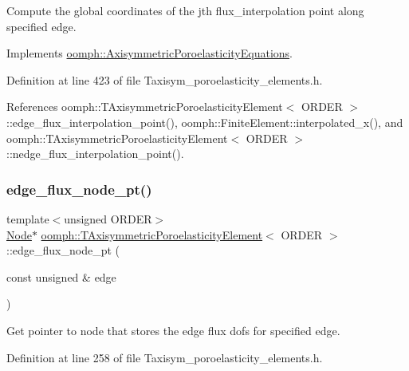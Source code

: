 Compute the global coordinates of the jth flux\+\_\+interpolation point along specified edge. 



Implements \hyperlink{classoomph_1_1AxisymmetricPoroelasticityEquations_a94eb24ad4a608057dd8601bbac14f241}{oomph\+::\+Axisymmetric\+Poroelasticity\+Equations}.



Definition at line 423 of file Taxisym\+\_\+poroelasticity\+\_\+elements.\+h.



References oomph\+::\+T\+Axisymmetric\+Poroelasticity\+Element$<$ O\+R\+D\+E\+R $>$\+::edge\+\_\+flux\+\_\+interpolation\+\_\+point(), oomph\+::\+Finite\+Element\+::interpolated\+\_\+x(), and oomph\+::\+T\+Axisymmetric\+Poroelasticity\+Element$<$ O\+R\+D\+E\+R $>$\+::nedge\+\_\+flux\+\_\+interpolation\+\_\+point().

\mbox{\label{classoomph_1_1TAxisymmetricPoroelasticityElement_a1dc2c583e30259f5b5729585d074c527}} 
\subsubsection{\texorpdfstring{edge\+\_\+flux\+\_\+node\+\_\+pt()}{edge\_flux\_node\_pt()}}
{\footnotesize\ttfamily template$<$unsigned O\+R\+D\+ER$>$ \\
\hyperlink{classoomph_1_1Node}{Node}$\ast$ \hyperlink{classoomph_1_1TAxisymmetricPoroelasticityElement}{oomph\+::\+T\+Axisymmetric\+Poroelasticity\+Element}$<$ O\+R\+D\+ER $>$\+::edge\+\_\+flux\+\_\+node\+\_\+pt (\begin{DoxyParamCaption}\item[{const unsigned \&}]{edge }\end{DoxyParamCaption})\hspace{0.3cm}{\ttfamily [inline]}}



Get pointer to node that stores the edge flux dofs for specified edge. 



Definition at line 258 of file Taxisym\+\_\+poroelasticity\+\_\+elements.\+h.



